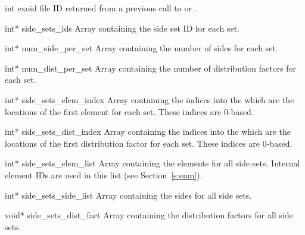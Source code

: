 \begin{parameters}
\item[{int exoid \R{}}]
\exo{} file ID returned from a previous call to  or
.

\item[{int* side_sets_ids \R{}}]
Array containing the side set ID for each set.

\item[{int* num_side_per_set \R{}}]
Array containing the number of sides for each set.

\item[{int* num_dist_per_set \R{}}]
Array containing the number of distribution factors for each set.

\item[{int* side_sets_elem_index \R{}}]
Array containing the indices into the  which
are the locations of the first element for each set. These indices are
0-based.

\item[{int* side_sets_dist_index \R{}}]
Array containing the indices into the  which
are the locations of the first distribution factor for each set. These
indices are 0-based.

\item[{int* side_sets_elem_list \R{}}]
Array containing the elements for all side sets. Internal element IDs
are used in this list (see Section~\ref{s:enm}).

\item[{int* side_sets_side_list \R{}}]
Array containing the sides for all side sets.

\item[{void* side_sets_dist_fact \R{}}]
Array containing the distribution factors for all side sets.
\end{parameters}

